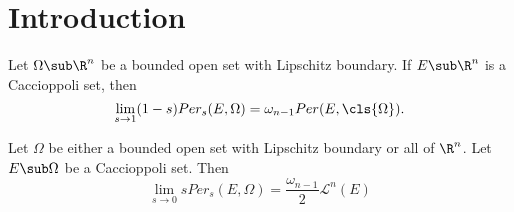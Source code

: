 \documentclass[../main.tex]{subfiles}
\begin{document}
\section{Introduction}

\begin{maintheorem}\label{sto1}
    Let $ \Omega\sub \R^{n} $ be a bounded open set with Lipschitz boundary. If $ E\sub \R^{n} $ is a Caccioppoli set, then
    \begin{equation}
        \lim_{s\to1}(1-s) Per_{s}(E, \Omega) = \omega_{n-1} Per(E,\cls{\Omega}).
    \end{equation}
\end{maintheorem}


\begin{maintheorem}\label{sto0}
    Let $ \Omega $ be either a bounded open set with Lipschitz boundary or all of $ \R^{n} $. Let $ E\sub \Omega $ be a Caccioppoli set. Then 
    \begin{equation}
        \lim_{s\to0} sPer_{s}(E,\Omega) = \frac{\omega_{n-1}}{2} \mathcal{L}^{n}(E)
    \end{equation}
\end{maintheorem}
\end{document}
